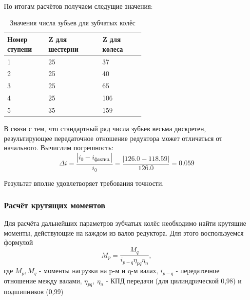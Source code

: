 \documentclass[14pt,a4paper,russian]{scrartcl}
\begin{document}
        По итогам расчётов получаем следущие значения:
        \begin{table}[h!]
            \begin{center}
                \begin{tabular}{p{0.13\linewidth}p{0.23\linewidth}p{0.2\linewidth}}
                    \hline
                    Номер ступени & Z для шестерни & Z для колеса \\
                    \hline
                    1   &   25 & 37 \\
                    2   &   25 & 40 \\
                    3   &   25 & 65 \\
                    4   &   25 & 106 \\
                    5   &   35 & 159 \\
                    \hline
                \end{tabular}
                \caption{Значения числа зубьев для зубчатых колёс}\label{tab:gears_z}
            \end{center}
        \end{table}
        
        В связи с тем, что стандартный ряд числа зубьев весьма дискретен, 
        результирующее передаточное отношение редуктора может отличаться от начального.
        Вычислим погрешность:
        \[ \Delta i = \frac{|i_0 - i_{\text{фактич.}}|}{i_0} =  
            \frac{|126.0-118.59|}{126.0} = 0.059\]
        
        Результат вполне удовлетворяет требования точности.
        
    \subsubsection{Расчёт крутящих моментов}
        Для расчёта дальнейших параметров зубчатых колёс необходимо найти крутящие моменты,
        действующие на каждом из валов редуктора. Для этого воспользуемся формулой
        \[ M_p = \frac{M_q}{i_{p-q}\eta_{pq}\eta_n}, \]
        где \( M_p, M_q \) - моменты нагрузки на p-м и q-м валах,
            \( i_{p-q} \) - передаточное отношение между валами,
            \( \eta_{pq},\ \eta_n \) - КПД передачи (для цилиндрической 0,98) и подшипников (0,99)\par
        
\end{document}
